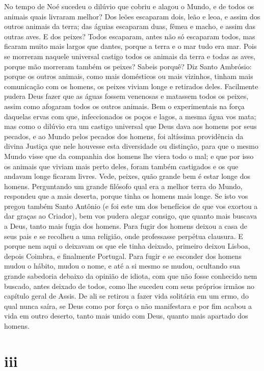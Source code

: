 No tempo de Noé sucedeu o dilúvio que cobriu e alagou o Mundo, e de
todos os animais quais livraram melhor? Dos leões escaparam dois, leão e
leoa, e assim dos outros animais da terra; das águias escaparam duas,
fêmea e macho, e assim das outras aves. E dos peixes? Todos escaparam,
antes não só escaparam todos, mas ficaram muito mais largos que dantes,
porque a terra e o mar tudo era mar. Pois se morreram naquele universal
castigo todos os animais da terra e todas as aves, porque mão morreram
também os peixes? Sabeis porquê? Diz Santo Ambrósio: porque os outros
animais, como mais domésticos ou mais vizinhos, tinham mais comunicação
com os homens, os peixes viviam longe e retirados deles. Facilmente
pudera Deus fazer que as águas fossem venenosas e matassem todos os
peixes, assim como afogaram todos os outros animais. Bem o experimentais
na força daquelas ervas com que, infeccionados os poços e lagos, a mesma
água vos mata; mas como o dilúvio era um castigo universal que Deus dava
aos homens por seus pecados, e ao Mundo pelos pecados dos homens, foi
altíssima providência da divina Justiça que nele houvesse esta
diversidade ou distinção, para que o mesmo Mundo visse que da companhia
dos homens lhe viera todo o mal; e que por isso os animais que viviam
mais perto deles, foram também castigados e os que andavam longe ficaram
livres.
Vede, peixes, quão grande bem é estar longe dos homens. Perguntando um
grande filósofo qual era a melhor terra do Mundo, respondeu que a mais
deserta, porque tinha os homens mais longe. Se isto vos pregou também
Santo Antônio (e foi este um dos benefícios de que vos exortou a dar
graças ao Criador), bem vos pudera alegar consigo, que quanto mais
buscava a Deus, tanto mais fugia dos
homens. Para fugir dos homens deixou a casa de seus pais e se recolheu a
uma religião, onde professasse perpétua clausura. E porque nem aqui o
deixavam os que ele tinha deixado, primeiro deixou Lisboa, depois
Coimbra, e finalmente Portugal. Para fugir e se esconder dos homens
mudou o hábito, mudou o nome, e até a si mesmo se mudou, ocultando sua
grande sabedoria debaixo da opinião de idiota, com que não fosse
conhecido nem buscado, antes deixado de todos, como lhe sucedeu com seus
próprios irmãos no capítulo geral de Assis. De ali se retirou a fazer
vida solitária em um ermo, do qual nunca saíra, se Deus como por força o
não manifestara e por fim acabou a vida em outro deserto, tanto mais
unido com Deus, quanto mais apartado dos homens.

\section{iii}


